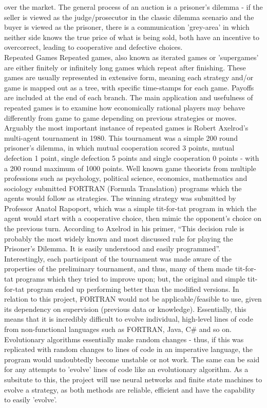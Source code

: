 \documentclass[12pt,a4paper]{article}
\makeatletter
\renewcommand\subsection{\@startsection {subsection}{1}{2mm}
                               {3pt plus 2pt minus 1pt}
                               {3pt plus 0pt}
                               {\normalfont\bfseries}}
\makeatother
\begin{document}
over the market. The general process of an auction is a prisoner's dilemma - if the seller is viewed as the judge/prosecutor in the classic dilemma scenario and the buyer is viewed as the prisoner, there is a communication 'grey-area' in which neither side knows the true price of what is being sold, both have an incentive to overcorrect, leading to cooperative and defective choices. \\

\subsection{Repeated Games}
Repeated games, also known as iterated games or 'supergames' are either finitely or infinitely long games which repeat after finishing. These games are usually represented in extensive form, meaning each strategy and/or game is mapped out as a tree, with specific time-stamps for each game. Payoffs are included at the end of each branch. The main application and usefulness of repeated games is to examine how economically rational players may behave differently from game to game depending on previous strategies or moves. Arguably the most important instance of repeated games is Robert Axelrod's multi-agent tournament in 1980. This tournament was a simple 200 round prisoner's dilemma, in which mutual cooperation scored 3 points, mutual defection 1 point, single defection 5 points and single cooperation 0 points - with a 200 round maximum of 1000 points. Well known game theorists from multiple professions such as psychology, political science, economics, mathematics and sociology submitted FORTRAN (Formula Translation) programs which the agents would follow as strategies. The winning strategy was submitted by Professor Anatol Rapoport, which was a simple tit-for-tat program in which the agent would start with a cooperative choice, then mimic the opponent's choice on the previous turn. According to Axelrod in his primer, “This decision rule is probably the most widely known and most discussed rule for playing the Prisoner's Dilemma. It is easily understood and easily programmed”\cite[p.~7]{3}. Interestingly, each participant of the tournament was made aware of the properties of the preliminary tournament, and thus, many of them made tit-for-tat programs which they tried to improve upon; but, the original and simple tit-for-tat program ended up performing better than the modified versions. In relation to this project, FORTRAN would not be applicable/feasible to use, given its dependency on supervision (previous data or knowledge). Essentially, this means that it is incredibly difficult to evolve individual, high-level lines of code from non-functional languages such as FORTRAN, Java, C\# and so on. Evolutionary algorithms essentially make random changes - thus, if this was replicated with random changes to lines of code in an imperative language, the program would undoubtedly become unstable or not work. The same can be said for any attempts to 'evolve' lines of code like an evolutionary algorithm. As a subsitute to this, the project will use neural networks and finite state machines to evolve a strategy, as both methods are reliable, efficient and have the capability to easily 'evolve'. \\
\end{document}
